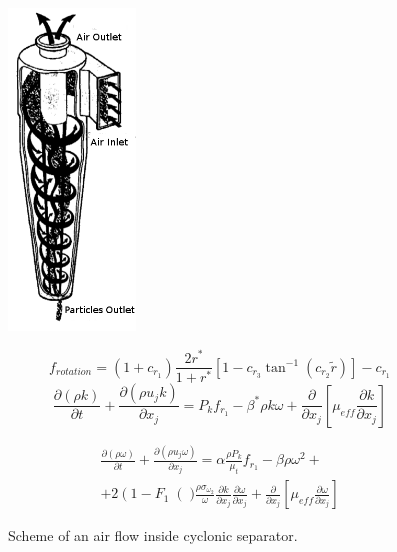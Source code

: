 \documentclass[a4paper]{jpconf}
\begin{document}
\begin{figure}[h]
\begin{minipage}{14pc}
\includegraphics[width=8pc]{flowScheme1.png}\hspace{6pc}
\caption{\label{fig:physicalModel} Scheme of an air flow inside cyclonic separator.}
\end{minipage}
\begin{minipage}{20pc}
\begin{equation}
\label{eq:1}
f_{rotation} = (1+c_{r_1}) \frac{2r^*}{1+r^*} [1-c_{r_3}\tan^{-1}(c_{r_2}\tilde{r})] -c_{r_1}
\end{equation}
\begin{equation}
\label{eq:2}
\frac{\partial (\rho k)}{\partial t} + \frac{\partial (\rho u_j k)}{\partial x_j} = P_k f_{r_1} - \beta^* \rho k \omega + \frac{\partial}{\partial x_j} \left[ \mu_{eff}\frac{\partial k}{\partial x_j} \right]
\end{equation}

\begin{equation}
\begin{split}
\frac{\partial (\rho \omega)}{\partial t} + \frac{\partial (\rho u_j \omega)}{\partial x_j} = \alpha \frac{\rho P_k}{\mu_t}f_{r_1}  - \beta \rho \omega^2 +\\
+ 2\left(1-F_1\right()\frac{\rho \sigma_{\omega_2}}{\omega}\frac{\partial k}{\partial x_j}\frac{\partial \omega}{\partial x_j} + \frac{\partial}{\partial x_j} \left[ \mu_{eff}\frac{\partial \omega}{\partial x_j} \right]
\end{split}
\end{equation}


\end{minipage}
\end{figure}
\end{document}
